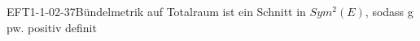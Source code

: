 
\begin{DEF}{EFT1-1-02-37}{Bündelmetrik auf Totalraum ist ein Schnitt in $Sym^2(E)$, sodass g pw. positiv definit}
\end{DEF}
